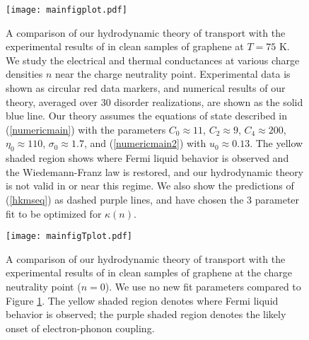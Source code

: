 \documentclass[10pt, oneside]{book}
\begin{document}
\begin{doublespace}
\begin{figure}[t]
\centering
\texttt{[image: mainfigplot.pdf]}
\caption{A comparison of our hydrodynamic theory of transport with the experimental results of \cite{Crossno1058} in clean samples of graphene at $T=75$ K.   We study the electrical and thermal conductances at various charge densities $n$ near the charge neutrality point.  Experimental data is shown as circular red data markers, and numerical results of our theory, averaged over 30 disorder realizations, are shown as the solid blue line.   Our theory assumes the equations of state described in (\ref{numericmain}) with the parameters $C_0\approx 11$, $C_2\approx 9$,  $C_4\approx 200$,  $\eta_0\approx 110$, $\sigma_0\approx 1.7$,  and (\ref{numericmain2}) with $u_0 \approx 0.13$.   The yellow shaded region shows where Fermi liquid behavior is observed and the Wiedemann-Franz law is restored, and our hydrodynamic theory is not valid in or near this regime.   We also show the predictions of (\ref{hkmseq}) as dashed purple lines, and have chosen the 3 parameter fit to be optimized for $\kappa(n)$. }
\label{mainfig}
\end{figure}

\begin{figure}[t]
\centering
\texttt{[image: mainfigTplot.pdf]}
\caption{A comparison of our hydrodynamic theory of transport with the experimental results of \cite{Crossno1058} in clean samples of graphene at the charge neutrality point ($n=0$).  We use no new fit parameters compared to Figure \ref{mainfig}.   The yellow shaded region denotes where Fermi liquid behavior is observed; the purple shaded region denotes the likely onset of electron-phonon coupling.}
\label{mainfigT}
\end{figure}



\end{doublespace}
\end{document}
